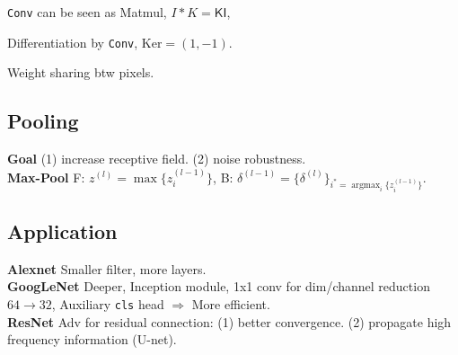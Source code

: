 \verb|Conv| can be seen as Matmul, \(I * K = \mathsf{K I}\),

Differentiation by \verb|Conv|, \(\text{Ker} = (1, -1)\).

Weight sharing btw pixels.

\subsection*{Pooling}
\textbf{Goal} (1) increase receptive field. (2) noise robustness. \\
\textbf{Max-Pool} \textsf{F}: \(z^{(l)}=\max \{z_{i}^{(l-1)}\}\), \textsf{B}: \(\delta^{(l-1)}=\{\delta^{(l)}\}_{i^{*}=\operatorname{argmax}_{i}\{z_{i}^{(l-1)}\}}\).

\subsection*{Application}
\textbf{Alexnet} Smaller filter, more layers. \\
\textbf{GoogLeNet} Deeper, Inception module, 1x1 conv for dim/channel reduction\(64\to 32\), Auxiliary \verb|cls| head \(\Rightarrow\) More efficient. \\
\textbf{ResNet} Adv for residual connection: (1) better convergence. (2) propagate high frequency information (U-net).

